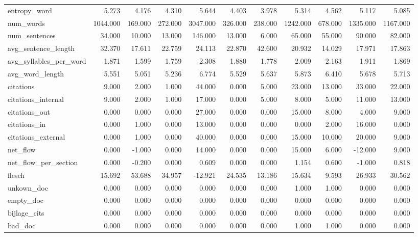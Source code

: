 \begin{tabular}{lrrrrrrrrrr}
\cline{1-11}
entropy\_word & 5.273 & 4.176 & 4.310 & 5.644 & 4.403 & 3.978 & 5.314 & 4.562 & 5.117 & 5.085 \\
\cline{1-11}
num\_words & 1044.000 & 169.000 & 272.000 & 3047.000 & 326.000 & 238.000 & 1242.000 & 678.000 & 1335.000 & 1167.000 \\
\cline{1-11}
num\_sentences & 34.000 & 10.000 & 13.000 & 146.000 & 13.000 & 6.000 & 65.000 & 55.000 & 90.000 & 82.000 \\
\cline{1-11}
avg\_sentence\_length & 32.370 & 17.611 & 22.759 & 24.113 & 22.870 & 42.600 & 20.932 & 14.029 & 17.971 & 17.863 \\
\cline{1-11}
avg\_syllables\_per\_word & 1.871 & 1.599 & 1.759 & 2.308 & 1.880 & 1.778 & 2.009 & 2.163 & 1.911 & 1.869 \\
\cline{1-11}
avg\_word\_length & 5.551 & 5.051 & 5.236 & 6.774 & 5.529 & 5.637 & 5.873 & 6.410 & 5.678 & 5.713 \\
\cline{1-11}
citations & 9.000 & 2.000 & 1.000 & 44.000 & 0.000 & 5.000 & 23.000 & 13.000 & 33.000 & 22.000 \\
\cline{1-11}
citations\_internal & 9.000 & 2.000 & 1.000 & 17.000 & 0.000 & 5.000 & 8.000 & 5.000 & 11.000 & 13.000 \\
\cline{1-11}
citations\_out & 0.000 & 0.000 & 0.000 & 27.000 & 0.000 & 0.000 & 15.000 & 8.000 & 4.000 & 9.000 \\
\cline{1-11}
citations\_in & 0.000 & 1.000 & 0.000 & 13.000 & 0.000 & 0.000 & 0.000 & 2.000 & 16.000 & 0.000 \\
\cline{1-11}
citations\_external & 0.000 & 1.000 & 0.000 & 40.000 & 0.000 & 0.000 & 15.000 & 10.000 & 20.000 & 9.000 \\
\cline{1-11}
net\_flow & 0.000 & -1.000 & 0.000 & 14.000 & 0.000 & 0.000 & 15.000 & 6.000 & -12.000 & 9.000 \\
\cline{1-11}
net\_flow\_per\_section & 0.000 & -0.200 & 0.000 & 0.609 & 0.000 & 0.000 & 1.154 & 0.600 & -1.000 & 0.818 \\
\cline{1-11}
flesch & 15.692 & 53.688 & 34.957 & -12.921 & 24.535 & 13.186 & 15.634 & 9.593 & 26.933 & 30.562 \\
\cline{1-11}
unkown\_doc & 0.000 & 0.000 & 0.000 & 0.000 & 0.000 & 0.000 & 1.000 & 1.000 & 0.000 & 0.000 \\
\cline{1-11}
empty\_doc & 0.000 & 0.000 & 0.000 & 0.000 & 0.000 & 0.000 & 0.000 & 0.000 & 0.000 & 0.000 \\
\cline{1-11}
bijlage\_cits & 0.000 & 0.000 & 0.000 & 0.000 & 0.000 & 0.000 & 0.000 & 0.000 & 0.000 & 0.000 \\
\cline{1-11}
bad\_doc & 0.000 & 0.000 & 0.000 & 0.000 & 0.000 & 0.000 & 1.000 & 1.000 & 0.000 & 0.000 \\
\cline{1-11}
\bottomrule
\end{tabular}
